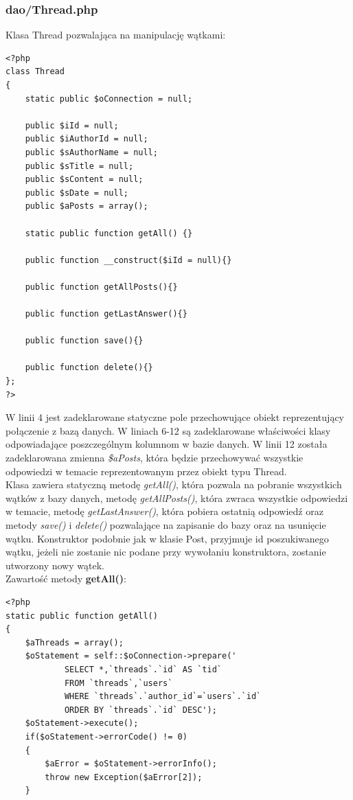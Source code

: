 \documentclass[a4paper,10pt]{article}
\begin{document}
\subsubsection{dao/Thread.php}
Klasa Thread pozwalająca na manipulację wątkami: \\
\begin{verbatim}
<?php
class Thread
{
	static public $oConnection = null;

	public $iId = null;
	public $iAuthorId = null;
	public $sAuthorName = null;
	public $sTitle = null;
	public $sContent = null;
	public $sDate = null;
	public $aPosts = array();

	static public function getAll() {}

	public function __construct($iId = null){}

	public function getAllPosts(){}

	public function getLastAnswer(){}

	public function save(){}

	public function delete(){}
};
?>
\end{verbatim}
W linii 4 jest zadeklarowane statyczne pole przechowujące obiekt reprezentujący połączenie z bazą danych. W liniach 6-12 są zadeklarowane właściwości klasy odpowiadające poszczególnym kolumnom w bazie danych. W linii 12 została zadeklarowana zmienna \textit{\$aPosts}, która będzie przechowywać wszystkie odpowiedzi w temacie reprezentowanym przez obiekt typu Thread. \\
Klasa zawiera statyczną metodę \textit{getAll()}, która pozwala na pobranie wszystkich wątków z bazy danych, metodę \textit{getAllPosts()}, która zwraca wszystkie odpowiedzi w temacie, metodę \textit{getLastAnswer()}, która pobiera ostatnią odpowiedź oraz metody \textit{save()} i \textit{delete()} pozwalające na zapisanie do bazy oraz na usunięcie wątku. Konstruktor podobnie jak w klasie Post, przyjmuje id poszukiwanego wątku, jeżeli nie zostanie nic podane przy wywołaniu konstruktora, zostanie utworzony nowy wątek.\\
Zawartość metody \textbf{getAll()}: \\
\begin{verbatim}
<?php
static public function getAll()
{
	$aThreads = array();
	$oStatement = self::$oConnection->prepare('
			SELECT *,`threads`.`id` AS `tid`
			FROM `threads`,`users`
			WHERE `threads`.`author_id`=`users`.`id`
			ORDER BY `threads`.`id` DESC');
	$oStatement->execute();
	if($oStatement->errorCode() != 0)
	{
		$aError = $oStatement->errorInfo();
		throw new Exception($aError[2]);
	}
\end{verbatim}
\end{document}
